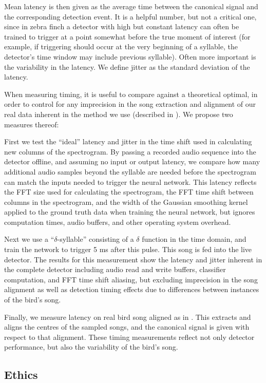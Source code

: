 \documentclass[10pt,letterpaper]{article}
\begin{document}
Mean latency is then given as the average time between the canonical
signal and the corresponding detection event.  It is a helpful number,
but not a critical one, since in zebra finch a detector with high but
constant latency can often be trained to trigger at a point somewhat
before the true moment of interest (for example, if triggering should
occur at the very beginning of a syllable, the detector's time window
may include previous syllable).  Often more important is the
variability in the latency.  We define jitter as the standard
deviation of the latency.

When measuring timing, it is useful to compare against a theoretical
optimal, in order to control for any imprecision in the song
extraction and alignment of our real data inherent in the method we
use (described in \cite{Poole2012}).  We propose two measures thereof:

First we test the ``ideal'' latency and jitter in the time shift used
in calculating new columns of the spectrogram. By passing a recorded
audio sequence into the detector offline, and assuming no input or
output latency, we compare how many additional audio samples beyond
the syllable are needed before the spectrogram can match the inputs
needed to trigger the neural network.  This latency reflects the FFT
size used for calculating the spectrogram, the FFT time shift between
columns in the spectrogram, and the width of the Gaussian smoothing
kernel applied to the ground truth data when training the neural
network, but ignores computation times, audio buffers, and other
operating system overhead.

Next we use a ``$\delta$-syllable'' consisting of a $\delta$ function
in the time domain, and train the network to trigger 5 ms after this
pulse.  This song is fed into the live detector.  The results for this
measurement show the latency and jitter inherent in the complete
detector including audio read and write buffers, classifier
computation, and FFT time shift aliasing, but excluding imprecision in
the song alignment as well as detection timing effects due to
differences between instances of the bird's song.

Finally, we measure latency on real bird song aligned as in
\cite{Poole2012}.  This extracts and aligns the centres of the sampled
songs, and the canonical signal is given with respect to that
alignment.  These timing measurements reflect not only detector
performance, but also the variability of the bird's song.

\subsection{Ethics}
\end{document}
